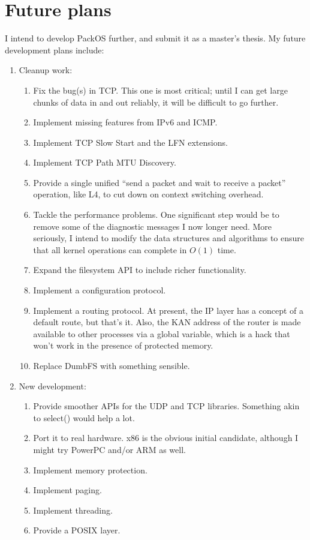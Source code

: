 \documentclass{article}
\begin{document}
\section{Future plans}

I intend to develop PackOS further, and submit it as a master's
thesis.  My future development plans include:

\begin{enumerate}
\item{Cleanup work:
\begin{enumerate}
\item{Fix the bug(s) in TCP.  This one is most critical;
  until I can get large chunks of data in and out reliably, it will be
  difficult to go further.}
\item{Implement missing features from IPv6 and ICMP.}
\item{Implement TCP Slow Start and the LFN extensions.}
\item{Implement TCP Path MTU Discovery.}
\item{Provide a single unified ``send a packet and wait to receive a
  packet'' operation, like L4,
  to cut down on context switching
  overhead.}
\item{Tackle the performance problems.  One significant step would be
  to remove some of the diagnostic messages I now longer need.  More
  seriously, I intend to modify the data structures and algorithms to
  ensure that all kernel operations can complete in \(O(1)\) time.}
\item{Expand the filesystem API to include richer functionality.}
\item{Implement a configuration protocol.}
\item{Implement a routing protocol.  At present, the IP layer
  has a concept of a default route, but that's it.  Also, the KAN
  address of the router is made available to other processes via a
  global variable, which is a hack that won't work in the presence of
  protected memory.}
\item{Replace DumbFS with something sensible.}
\end{enumerate}
}

\item{New development:
\begin{enumerate}
\item{Provide smoother APIs for the UDP and TCP libraries.  Something
  akin to select() would help a lot.}
\item{Port it to real hardware.  x86 is the obvious initial candidate,
  although I might try PowerPC and/or ARM as well.}
\item{Implement memory protection.}
\item{Implement paging.}
\item{Implement threading.}
\item{Provide a POSIX layer.}
\end{enumerate}
}
\end{enumerate}
\end{document}
